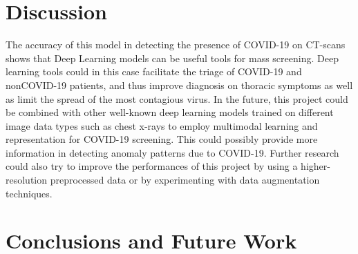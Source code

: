 \documentclass[12pt, letterpaper]{article}
\begin{document}
\newpage
\section{Discussion}
The accuracy of this model in detecting the presence of COVID-19 on CT-scans shows that Deep Learning models can be useful tools for mass screening. Deep learning tools could in this case facilitate the triage of COVID-19 and nonCOVID-19 patients, and thus improve diagnosis on thoracic symptoms as well as limit the spread of the most contagious virus. In the future, this project could be combined with other well-known deep learning models trained on different image data types such as chest x-rays to employ multimodal learning and representation for COVID-19 screening. This could possibly provide more information in detecting anomaly patterns due to COVID-19. Further research could also try to improve the performances of this project by using a higher-resolution preprocessed data or by experimenting with data augmentation techniques.

\newpage
\section{Conclusions and Future Work}


\newpage


\nocite{*}
\end{document}

